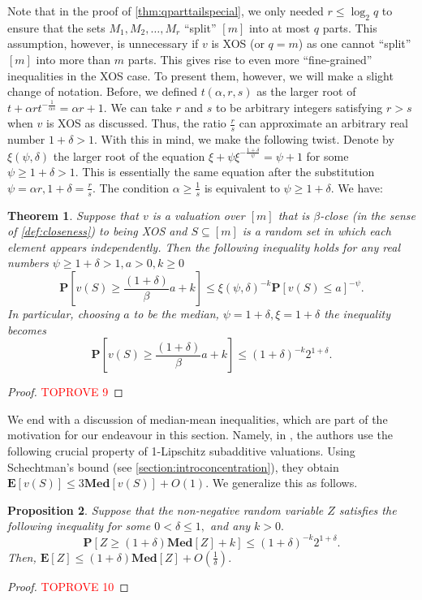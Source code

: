 \documentclass[11pt]{article}\usepackage{amsfonts}
\newtheorem{theorem}{Theorem}
\newtheorem{proposition}[theorem]{Proposition}
\numberwithin{theorem}{subsection}
\newcommand{\prob}{\mathbf{P}}
\newcommand{\median}{\mathbf{Med}}
\newcommand{\expect}{\mathbf{E}}
\begin{document}
\noindent
Note that in the proof of \cref{thm:qparttailspecial}, we only needed $r\le \log_2 q$ to ensure that the sets $M_1, M_2, \ldots, M_r$ ``split'' $[m]$ into at most $q$ parts. This assumption, however, is unnecessary if $v$ is XOS (or $q = m$) as one cannot ``split'' $[m]$ into more than $m$ parts. This gives rise to even more ``fine-grained'' inequalities in the XOS case. To present them, however, we will make a slight change of notation. Before, we defined $t(\alpha, r,s)$ as the larger root of $t + \alpha r t^{-\frac{1}{\alpha s}} = \alpha r + 1.$
We can take $r$ and $s$ to be arbitrary integers satisfying $r>s$ when $v$ is XOS as discussed. Thus, the ratio $\frac{r}{s}$ can approximate an arbitrary real number $1+ \delta > 1.$ With this in mind, we make the following twist. Denote by $\xi(\psi, \delta)$ the larger root of the equation $\xi + \psi \xi^{-\frac{1+\delta}{\psi}} = \psi+1$ for some $\psi \ge 1+\delta >1.$ This is essentially the same equation after the substitution $\psi =\alpha r, 1+ \delta = \frac{r}{s}.$ The condition $\alpha \ge \frac{1}{s}$ is equivalent to $\psi \ge 1+\delta.$
We have:

\begin{theorem}
\label{thm:tailboundxos}
    Suppose that $v$ is a valuation over $[m]$ that is $\beta$-close (in the sense of \cref{def:closeness}) to being XOS and $S\subseteq [m]$ is a random set in which each element appears independently. Then the following inequality holds for any real numbers $\psi\ge 1+\delta>1,a>0, k\ge 0$
    $$
    \prob[v(S)\ge \frac{(1+\delta)}{\beta}a+k]\le 
    \xi(\psi, \delta)^{-k}\prob[v(S)\le a]^{-\psi}.
    $$
    In particular, choosing $a$ to be the median, $\psi = 1+\delta,\xi = 1+\delta$ the inequality becomes
    $$
    \prob[v(S)\ge \frac{(1+\delta)}{\beta}a+k]\le 
    \left(1+\delta\right)^{-k}2^{1+\delta}.
    $$
\end{theorem}
\begin{proof}\textcolor{red}{TOPROVE 9}\end{proof}


\noindent
We end with a discussion of median-mean inequalities, which are part of the motivation for our endeavour in this section. Namely, in \cite{RubinsteinW18}, the authors use the following crucial property of 1-Lipschitz subadditive valuations. Using Schechtman's bound (see \cref{section:introconcentration}), they obtain
$\expect[v(S)]\le 
3\median[v(S)] + O(1)
.$ We generalize this as follows.

\begin{proposition}
\label{prop:mediantomean}
Suppose that the non-negative random variable $Z$ satisfies the following inequality for some $0<\delta\le 1,$ and any $k >0.$
$$
\prob[Z\ge (1 + \delta)\median[Z] + k]\le 
(1+\delta)^{-k}2^{1+\delta}.
$$
Then, $\expect[Z]\le (1 + \delta)\median[Z] + O(\frac{1}{\delta}).$
\end{proposition}
\begin{proof}\textcolor{red}{TOPROVE 10}\end{proof}
\end{document}
